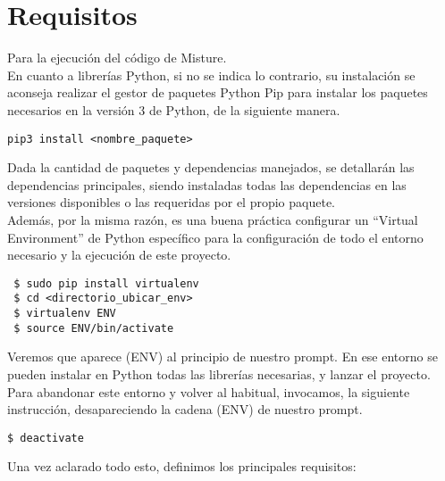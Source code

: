 \cleardoublepage

\chapter{Requisitos}
\label{app:req}

Para la ejecución del código de Misture.\\

En cuanto a librerías Python, si no se indica lo contrario, su instalación se aconseja realizar el gestor de paquetes Python Pip para instalar los paquetes necesarios en la versión 3 de Python, de la siguiente manera.
\begin{center}
\begin{verbatim}
pip3 install <nombre_paquete>
\end{verbatim}
\end{center}


Dada la cantidad de paquetes y dependencias manejados, se detallarán las dependencias principales, siendo instaladas todas las dependencias en las versiones disponibles o las requeridas por el propio paquete.\\


Además, por la misma razón, es una buena práctica configurar un ``Virtual Environment'' de Python específico para la configuración de todo el entorno necesario y la ejecución de este proyecto.\\
\begin{center}
\begin{verbatim}
 $ sudo pip install virtualenv
 $ cd <directorio_ubicar_env>
 $ virtualenv ENV
 $ source ENV/bin/activate
\end{verbatim}
\end{center}

Veremos que aparece (ENV) al principio de nuestro prompt. En ese entorno se pueden instalar en Python todas las librerías necesarias, y lanzar el proyecto. Para abandonar este entorno y volver al habitual, invocamos, la siguiente instrucción, desapareciendo la cadena (ENV) de nuestro prompt.
\begin{center}
\begin{verbatim}
$ deactivate
\end{verbatim}
\end{center}

Una vez aclarado todo esto, definimos los principales requisitos:\\

